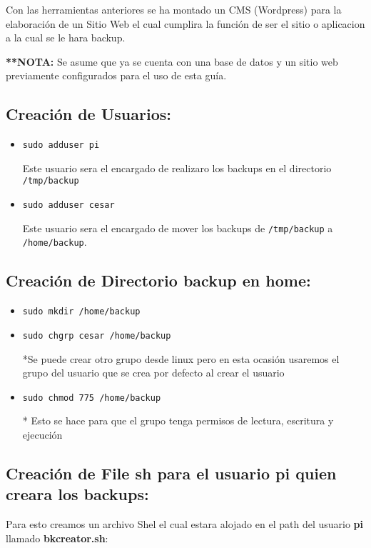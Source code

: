 \documentclass{article}
\begin{document}
Con las herramientas anteriores se ha montado un CMS (Wordpress) para la elaboración de un Sitio Web el cual cumplira la función de ser el sitio o aplicacion a la cual se le hara backup.

\textbf{**NOTA:} Se asume que ya se cuenta con una base de datos y un sitio web previamente configurados para el uso de esta guía.

\subsection{Creación de Usuarios:}
\begin{itemize}
     \item \verb|sudo adduser pi|
     
Este usuario sera el encargado de realizaro los backups en el directorio \verb|/tmp/backup|

\item \verb|sudo adduser cesar| 

Este usuario sera el encargado de mover los backups de \verb|/tmp/backup| a \verb|/home/backup|.

\end{itemize}
\subsection{Creación de Directorio backup en home:}
\begin{itemize}
     \item \verb|sudo mkdir /home/backup|
     \item \verb|sudo chgrp cesar /home/backup|
     
*Se puede crear otro grupo desde linux pero en esta ocasión usaremos el grupo del usuario que se crea por defecto al crear el usuario

\item \verb|sudo chmod 775 /home/backup| 

* Esto se hace para que el grupo tenga permisos de lectura, escritura y ejecución

\end{itemize}

\subsection{Creación de File sh para el usuario \textbf{pi} quien creara los backups:}

Para esto creamos un archivo Shel el cual estara alojado en el path del usuario \textbf{pi} llamado \textbf{bkcreator.sh}:
\end{document}
